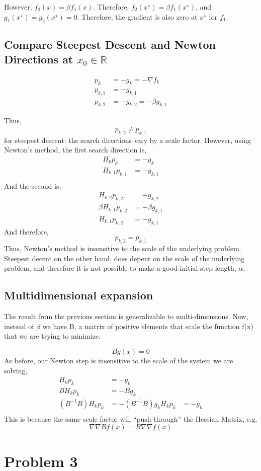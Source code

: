 \documentclass{article}
\begin{document}
However, $f_2(x) = \beta f_1(x)$. Therefore,  $f_2(x^\star) = \beta
f_1(x^\star)$, and $g_1(x^\star) = g_2(x^\star) = 0 $. Therefore, the
gradient is also zero at $x^\star$ for $f_1$.

\subsection{Compare Steepest Descent and Newton Directions at $x_0 \in \mathbb{R}$}

\begin{align*}
 p_k&=-g_k = -\nabla f_k\\
 p_{k,1}&=-g_{k,1}\\
 p_{k,2}&=-g_{k,2} = -\beta g_{k,1}
\end{align*}

Thus, 
\begin{equation}
p_{k,2} \ne p_{k,1}
\end{equation}
for steepest descent: the search directions
vary by a scale factor. However, using Newton's method, the first search
direction is,
\begin{align*}
 H_k p_k&=-g_k \\
 H_{k,1} p_{k,1}&=-g_{k,1}\\
\end{align*}
And the second is,
\begin{align*}
 H_{k,2} p_{k,2}&=-g_{k,2}\\
 \beta H_{k,1} p_{k,2}&=- \beta g_{k,1}\\
 H_{k,1} p_{k,2}&=-g_{k,1}
\end{align*}
And therefore, 
\begin{equation}
p_{k,2} = p_{k,1}
\end{equation}
Thus, Newton's method is insensitive to the scale of the underlying
problem. Steepest decent on the other hand, does depent on the scale of
the underlying problem, and therefore it is not possible to make a good
initial step length, $\alpha$.

\subsection{Multidimensional expansion}

The result from the previous section is generalizable to
multi-dimensions. Now, instead of $\beta$ we have B, a matrix of
positive elements that scale the function f(x) that we are trying to
minimize. 

\begin{equation}
 Bg(x) = 0
\end{equation}
As before, our Newton step is insensitive to the scale of the system we
are solving, 
\begin{align*}
 H_{k} p_{k}&=-g_{k}\\
 B H_{k} p_{k}&=- B g_{k}\\
 (B^{-1}B)H_{k} p_{k}&=-(B^{-1}B)g_{k}
 H_{k} p_{k}&=-g_{k}\\
\end{align*}
This is because the same scale factor will ``push-through'' the Hessian
Matrix, e.g. 
\begin{equation}
\nabla\nabla B f(x) = B \nabla\nabla f(x) 
\end{equation}

\section{Problem 3}
\end{document}
